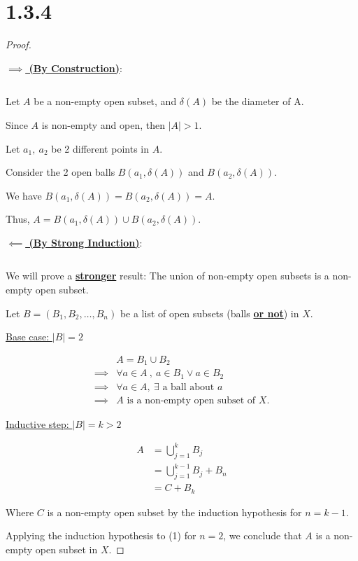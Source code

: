 \documentclass{article}
\begin{document}
\section*{1.3.4}
\begin{proof}
  $ $

  \noindent
  \textbf{\underline{$\implies$ (By Construction)}}:

  $ $
  
  Let $A$ be a non-empty open subset, and $\delta(A)$ be the diameter of A.

  Since $A$ is non-empty and open, then $|A| > 1$.

  Let $a_1, \: a_2$ be 2 different points in $A$.

  Consider the 2 open balls $B(a_1, \delta(A))$ and $B(a_2, \delta(A))$.

  We have $B(a_1, \delta(A)) = B(a_2, \delta(A)) = A$.

  Thus, $A = B(a_1, \delta(A)) \cup B(a_2, \delta(A))$.
  \newline
  
  \noindent
  \textbf{\underline{$\impliedby$ (By Strong Induction)}}:

  $ $

  We will prove a \textbf{\underline{stronger}} result: The union of non-empty open subsets is a non-empty open subset.

  Let $B=(B_1, B_2, \ldots, B_n)$ be a list of open subsets (balls \textbf{\underline{or not}}) in $X$.
  \newline 

  \underline{Base case: $|B| = 2$}

  \begin{align*}
    &A = B_1 \cup B_2 \\
    \implies& \forall a \in A \:, \: a \in B_1 \lor a \in B_2 \\
    \implies& \forall a \in A, \: \exists \text{ a ball about } a \\
    \implies& A \text{ is a non-empty open subset of } X.
  \end{align*}
  
  \underline{Inductive step: $|B|= k > 2$}

  \begin{align}
    A &= \bigcup_{j = 1}^{k} B_j \nonumber \\
    &= \bigcup_{j = 1}^{k-1} B_j + B_n \nonumber \\
    &= C + B_k
  \end{align}
  
  \noindent
  Where $C$ is a non-empty open subset by the induction hypothesis for $n = k-1$.
  \newline

  \noindent
  Applying the induction hypothesis to (1) for $n = 2$, we conclude that $A$ is a non-empty open subset in $X$.

\end{proof}
\end{document}
